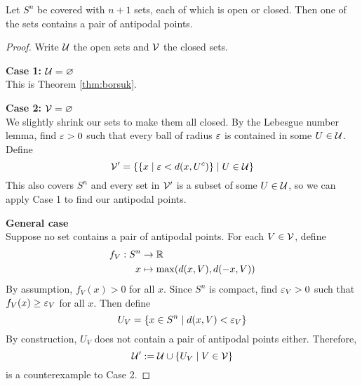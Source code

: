 \documentclass{article}
\begin{document}
\begin{nthm}[Greene]\label{thm:greene}
  Let $S^n$ be covered with $n + 1$ sets, each of which is open or closed. Then one of the sets contains a pair of antipodal points.  
\end{nthm}
\begin{proof}
  Write $\mathcal U$ the open sets and $\mathcal V$ the closed sets.

  {\bf Case 1: $\mathcal U = \varnothing$} \\
  This is Theorem \ref{thm:borsuk}.

  {\bf Case 2: $\mathcal V = \varnothing$} \\
  We slightly shrink our sets to make them all closed. By the Lebesgue number lemma, find $\varepsilon > 0$ such that every ball of radius $\varepsilon$ is contained in some $U \in \mathcal U$. Define
  $$\mathcal V' = \{\{x \mid \varepsilon < d(x, U^c)\} \mid U \in \mathcal U\}$$
  This also covers $S^n$ and every set in $\mathcal V'$ is a subset of some $U \in \mathcal U$, so we can apply Case 1 to find our antipodal points.

  {\bf General case} \\
  Suppose no set contains a pair of antipodal points. For each $V \in \mathcal V$, define
  \begin{align*}
    f_V : S^n & \rightarrow \mathbb R \\
    x & \mapsto \max(d(x, V), d(-x, V))
  \end{align*}
  By assumption, $f_V(x) > 0$ for all $x$. Since $S^n$ is compact, find $\varepsilon_V > 0$ such that $f_V(x) \ge \varepsilon_V$ for all $x$. Then define
  $$U_V = \{x \in S^n \mid d(x, V) < \varepsilon_V\}$$
  By construction, $U_V$ does not contain a pair of antipodal points either. Therefore,
  $$\mathcal U' := \mathcal U \cup \{U_V \mid V \in \mathcal V\}$$
  is a counterexample to Case 2.
\end{proof}

\newlec
\end{document}
